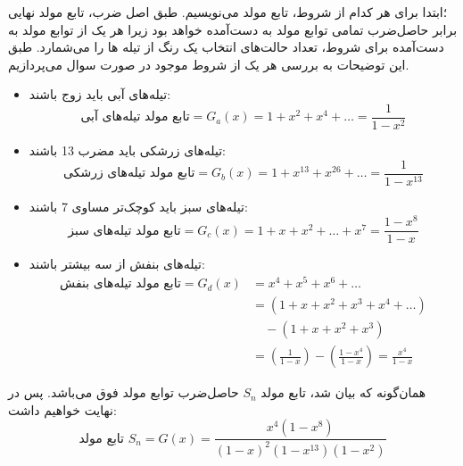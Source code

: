 \p
 ؛ابتدا برای هر کدام از شروط، تابع مولد می‌نویسیم. طبق اصل ضرب، تابع مولد نهایی برابر حاصل‌ضرب تمامی  توابع مولد به دست‌آمده خواهد بود
    زیرا هر یک از توابع مولد به دست‌آمده برای شروط، تعداد حالت‌های انتخاب‌ یک رنگ از تیله ها را می‌شمارد.  
   طبق این توضیحات به بررسی هر یک از شروط موجود در صورت سوال می‌پردازیم.
\begin{itemize}
    \item 
    تیله‌های آبی باید زوج باشند:
    $$\text{تابع مولد تیله‌های آبی} = G_a(x) = 1 + x^2 + x^4 + \ldots = \frac{1}{1-x^2}$$
    \item
    تیله‌های زرشکی باید مضرب 13 باشند:
    $$\text{تابع مولد تیله‌های زرشکی} = G_b(x) = 1 + x^{13} + x^{26} + \ldots = \frac{1}{1-x^{13}}$$
    \item
    تیله‌های سبز باید کوچک‌تر مساوی 7 باشند:
    $$\text{تابع مولد تیله‌های سبز} = G_c(x) = 1 + x + x^2 + \ldots + x^7 = \frac{1-x^8}{1-x}$$
    \item
    تیله‌های بنفش از سه بیشتر باشند:
    \begin{align*}
    \text{تابع مولد تیله‌های بنفش} = G_d(x) &= x^4 + x^5 + x^6 + \ldots\\
    &= (1+x+x^2+x^3+x^4+\ldots) \\ & \quad- (1 + x + x^2 + x^3)\\
    &= (\frac{1}{1-x}) - (\frac{1-x^4}{1-x}) = \frac{x^4}{1-x}
    \end{align*}
\end{itemize}
  همان‌گونه که بیان شد، تابع مولد
$S_n$
حاصل‌ضرب توابع مولد فوق می‌باشد. پس در نهایت خواهیم داشت:
$$\text{تابع مولد $S_n$} = G(x) = \frac{x^4(1-x^8)}{(1-x)^2(1-x^{13})(1-x^{2})}$$
